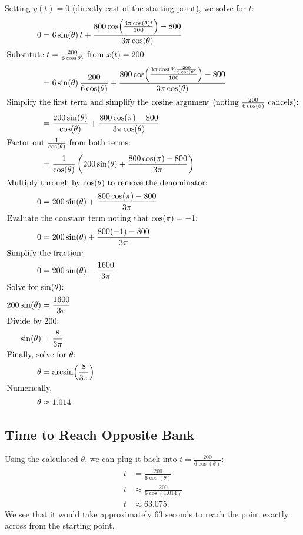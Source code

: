 \documentclass{article}
\begin{document}
Setting \(y(t) = 0\) (directly east of the starting point), we solve for \(t\):
\begin{align*}
  0 &= 6 \sin(\theta)\,t + \frac{800\cos\Bigl(\frac{3\pi\cos(\theta)t}{100}\Bigr)-800}{3\pi\cos(\theta)} \\
\intertext{Substitute \(t=\frac{200}{6\cos(\theta)}\) from \(x(t)=200\):}
  &= 6 \sin(\theta)\,\frac{200}{6\cos(\theta)} + \frac{800\cos\Bigl(\frac{3\pi\cos(\theta)\frac{200}{6\cos(\theta)}}{100}\Bigr)-800}{3\pi\cos(\theta)} \\
\intertext{Simplify the first term and simplify the cosine argument (noting \(\frac{200}{6\cos(\theta)}\) cancels):}
  &= \frac{200\sin(\theta)}{\cos(\theta)} + \frac{800\cos(\pi)-800}{3\pi\cos(\theta)} \\
\intertext{Factor out \(\frac{1}{\cos(\theta)}\) from both terms:}
  &= \frac{1}{\cos(\theta)}\left(200\sin(\theta)+ \frac{800\cos(\pi)-800}{3\pi}\right) \\
\intertext{Multiply through by \(\cos(\theta)\) to remove the denominator:}
  0 &= 200\sin(\theta)+ \frac{800\cos(\pi)-800}{3\pi} \\
\intertext{Evaluate the constant term noting that \(\cos(\pi)=-1\):}
  0 &= 200\sin(\theta)+ \frac{800(-1)-800}{3\pi} \\
\intertext{Simplify the fraction:}
  0 &= 200\sin(\theta)- \frac{1600}{3\pi} \\
\intertext{Solve for \(\sin(\theta)\):}
  200\sin(\theta) &= \frac{1600}{3\pi} \\
\intertext{Divide by 200:}
  \sin(\theta) &= \frac{8}{3\pi} \\
\intertext{Finally, solve for \(\theta\):}
  \theta &= \arcsin\Bigl(\frac{8}{3\pi}\Bigr) \\
\intertext{Numerically,}
  \theta &\approx 1.014.
\end{align*}

\subsection{Time to Reach Opposite Bank}

Using the calculated \(\theta\), we can plug it back into \(t = \frac{200}{6 \cos(\theta)}\):
\begin{align*}
    t &=  \frac{200}{6 \cos(\theta)} \\
    t &\approx \frac{200}{6 \cos(1.014)} \\
    t &\approx 63.075.
\end{align*}
We see that it would take approximately 63 seconds to reach the point exactly across from the starting point.
\end{document}
